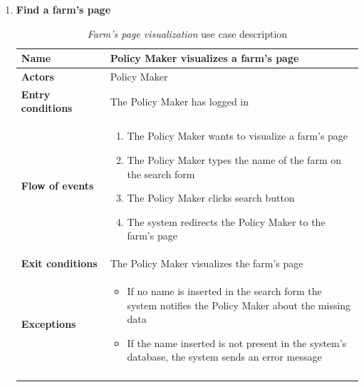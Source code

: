 \begin{enumerate}
    \item \textbf{Find a farm's page}
    \begin{longtable}{p{0.26\linewidth}p{0.75\linewidth}}
        \toprule
        \textbf{Name} & \textbf{Policy Maker visualizes a farm’s page} \\
        \midrule
        \textbf{Actors} & Policy Maker \\
        \midrule
        \textbf{Entry conditions} & The Policy Maker has logged in\\
        \midrule
        \textbf{Flow of events} & 
        \begin{enumerate}
            \item The Policy Maker wants to visualize a farm's page
            \item The Policy Maker types the name of the farm on the search form
            \item The Policy Maker clicks search button
            \item The system redirects the Policy Maker to the farm's page
        \end{enumerate} \\
        \midrule
        \textbf{Exit conditions} & The Policy Maker visualizes the farm's page\\
        \midrule
        \textbf{Exceptions} & 
        \begin{itemize}
            \item If no name is inserted in the search form the system notifies the Policy Maker about the missing data
            \item If the name inserted is not present in the system's database, the system sends an error message
        \end{itemize}\\
        \bottomrule
        \caption{\emph{Farm’s page visualization} use case description}
    \end{longtable}


\end{enumerate}
